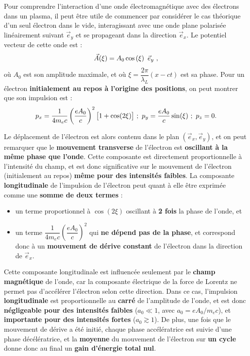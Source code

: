 \begin{refsection}
Pour comprendre l'interaction d'une onde électromagnétique avec des électrons dans un plasma, il peut être utile de commencer par considérer le cas théorique d'un seul électron dans le vide, interagissant avec une onde plane polarisée linéairement suivant $\vec{e}_y$ et se propageant dans la direction $\vec{e}_x$. Le potentiel vecteur de cette onde est : 
\begin{equation}
    \vec{A}(\xi)=A_0 \cos\left(\xi\right) ~ \vec{e}_y ~ \rm ,
\end{equation}
où $A_0$ est son amplitude maximale, et où $\xi=\dfrac{2 \pi}{\lambda_L} (x-ct)$ est sa phase. Pour un électron \textbf{initialement au repos à l'origine des positions}, on peut montrer \parencite{macchi_2012, yang_2011} que son impulsion est : 
\begin{equation}
    p_x=\dfrac{1}{4 m_e c} \left(\dfrac{e A_0}{c}\right)^2 \big[1+\cos(2 \xi)\big] ~ ; ~     p_y=\dfrac{e A_0}{c}\sin(\xi) ~ ; ~ p_z=0 \rm .
\end{equation}

Le déplacement de l'électron est alors contenu dans le plan $(\vec{e}_x,\vec{e}_y)$, et on peut remarquer que le \textbf{mouvement transverse} de l'électron est \textbf{oscillant à la même phase que l'onde}. Cette composante est directement proportionnelle à l'intensité du champ, et est donc significative sur le mouvement de l'électron (initialement au repos) \textbf{même pour des intensités faibles}. La composante \textbf{longitudinale} de l'impulsion de l'électron peut quant à elle être exprimée comme une \textbf{somme de deux termes} :
\begin{itemize}
    \item un terme proportionnel à $\cos(2 \xi)$ oscillant à \textbf{2 fois} la phase de l'onde, et 
    \item un terme $\dfrac{1}{4 m_e c} \left(\dfrac{e A_0}{c}\right)^2$ qui \textbf{ne dépend pas de la phase}, et correspond donc à un \textbf{mouvement de dérive constant} de l'électron dans la direction de $\vec{e}_x$.
\end{itemize}

Cette composante longitudinale est influencée seulement par le \textbf{champ magnétique} de l'onde, car la composante électrique de la force de Lorentz ne permet pas d'accélérer l'électron selon cette direction. Dans ce cas, l'impulsion \textbf{longitudinale} est proportionnelle au \textbf{carré} de l'amplitude de l'onde, et est donc \textbf{négligeable pour des intensités faibles} ($a_0\ll 1$, avec $a_0=e A_0/m_e c$), et \textbf{importante pour des intensités fortes} ($a_0 \gtrsim 1$). De plus, une fois que le mouvement de dérive a été initié, chaque phase accélératrice est suivie d'une phase décélératrice, et la \textbf{moyenne} du mouvement de l'électron sur \textbf{un cycle} donne donc au final un \textbf{gain d'énergie total nul}. 


\end{refsection}
